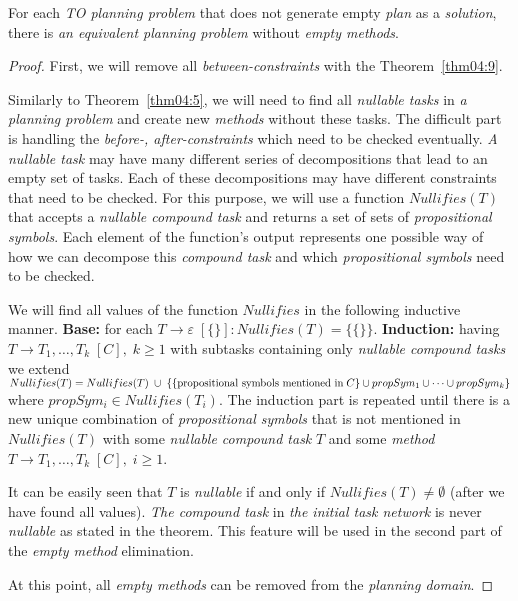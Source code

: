 \begin{thm}\label{thm04:10}
    For each \emph{TO planning problem} that does not generate empty \emph{plan} as a \emph{solution}, there is \emph{an equivalent planning problem} without \emph{empty methods}.
\end{thm}
\begin{proof}
    First, we will remove all \emph{between-constraints} with the Theorem~\ref{thm04:9}.

    Similarly to Theorem~\ref{thm04:5}, we will need to find all \emph{nullable tasks} in \emph{a planning problem} and create new \emph{methods} without these tasks. The difficult part is handling the \emph{before-, after-constraints} which need to be checked eventually. \emph{A nullable task} may have many different series of decompositions that lead to an empty set of tasks. Each of these decompositions may have different constraints that need to be checked. For this purpose, we will use a function $Nullifies(T)$ that accepts a \emph{nullable compound task} and returns a set of sets of \emph{propositional symbols}. Each element of the function's output represents one possible way of how we can decompose this \emph{compound task} and which \emph{propositional symbols} need to be checked.

    We will find all values of the function $Nullifies$ in the following inductive manner. \textbf{Base:} for each $T \rightarrow \varepsilon \; [\{\}]: Nullifies(T) = \{\{\}\}$. \textbf{Induction:} having $T \rightarrow T_1, \dots, T_k \; [C], \; k \geq 1$ with subtasks containing only \emph{nullable compound tasks} we extend $Nullifies(T) = Nullifies(T) \; \cup \; \{\{\text{propositional symbols mentioned in} \; C\} \\ \cup propSym_1 \cup \dots \cup propSym_k\}$ where $propSym_i \in Nullifies(T_i)$. The induction part is repeated until there is a new unique combination of \emph{propositional symbols} that is not mentioned in $Nullifies(T)$ with some \emph{nullable compound task} $T$ and some \emph{method} $T \rightarrow T_1, \dots, T_k \; [C], \; i \geq 1$.

    It can be easily seen that $T$ is \emph{nullable} if and only if $Nullifies(T) \neq \emptyset$ (after we have found all values). \emph{The compound task} in \emph{the initial task network} is never \emph{nullable} as stated in the theorem. This feature will be used in the second part of the \emph{empty method} elimination.

    At this point, all \emph{empty methods} can be removed from the \emph{planning domain}.


\end{proof}
